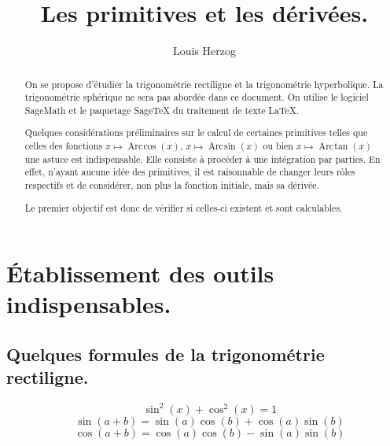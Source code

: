 \documentclass[a4paper,12pt]{report}
\newcommand{\sommaire}{\shorttoc{Sommaire}{1}}
\renewcommand{\arcsin}{\mathop{\mathrm{Arc\mspace{2mu}sin}}}
\renewcommand{\arccos}{\mathop{\mathrm{Arc\mspace{2mu}cos}}}
\renewcommand{\arctan}{\mathop{\mathrm{Arc\mspace{2mu}tan}}}
\begin{document}
 


\setlength{\parindent}{0pt}



\title{Les primitives et les dérivées.}


\author{Louis Herzog} 

\maketitle 

\setcounter{tocdepth}{2}
\tableofcontents


\begin{abstract}
On se propose d'étudier la trigonométrie rectiligne et la trigonométrie hyperbolique. La trigonométrie sphérique ne sera pas abordée dans ce document. On utilise le logiciel SageMath et le paquetage {Sage\TeX} du traitement de texte \LaTeX .

Quelques considérations préliminaires sur le calcul de certaines primitives telles que celles des fonctions 
 $x \mapsto \arccos(x) $,  $x \mapsto \arcsin(x) $ ou bien $x \mapsto \arctan(x) $ une astuce est indispensable. Elle consiste à procéder à une intégration par parties. En effet, n'ayant aucune idée des primitives, il est raisonnable de changer leurs rôles respectifs et de considérer, non plus la fonction initiale, mais sa dérivée.
 
Le premier objectif est donc de vérifier si celles-ci existent et sont calculables.


\end{abstract} 

\chapter{Établissement des outils indispensables.}
 
\section{Quelques formules de la trigonométrie rectiligne.} 
\begin{equation} 
\quad \sin^2(x) + \cos^2(x)  = 1 
\end{equation}
\begin{equation} 
\quad \sin(a+b)  = \sin(a)\cos(b) + \cos(a)\sin(b) 
\end{equation}
\begin{equation} 
\quad \cos(a+b)  = \cos(a)\cos(b) - \sin(a)\sin(b)  
\end{equation}
\end{document}
